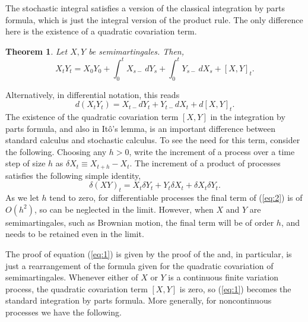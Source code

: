 \documentclass[12pt]{article}
\newtheorem*{theorem*}{Theorem}
\begin{document}

The stochastic integral satisfies a version of the classical integration by parts formula, which is just the integral version of the product rule. The only difference here is the existence of a quadratic covariation term.

\begin{theorem*}
Let $X,Y$ be semimartingales. Then,
\begin{equation}\label{eq:1}
X_tY_t = X_0Y_0+\int_0^t X_{s-}\,dY_s+\int_0^tY_{s-}\,dX_s + [X,Y]_t.
\end{equation}
\end{theorem*}

Alternatively, in differential notation, this reads
\begin{equation*}
d(X_tY_t)=X_{t-}dY_t + Y_{t-}dX_t + d[X,Y]_t.
\end{equation*}
The existence of the quadratic covariation term $[X,Y]$ in the integration by parts formula, and also in It\^o's lemma, is an important difference between standard calculus and stochastic calculus. To see the need for this term, consider the following. Choosing any $h>0$, write the increment of a process over a time step of size $h$ as $\delta X_t\equiv X_{t+h}-X_t$. The increment of a product of processes satisfies the following simple identity,
\begin{equation}\label{eq:2}
\delta (XY)_t = X_t\delta Y_t + Y_t\delta X_t + \delta X_t\delta Y_t. 
\end{equation}
As we let $h$ tend to zero, for differentiable processes the final term of (\ref{eq:2}) is of  $O(h^2)$, so can be neglected in the limit. However, when $X$ and $Y$ are semimartingales, such as Brownian motion, the final term will be of order $h$, and needs to be retained even in the limit.

The proof of equation (\ref{eq:1}) is given by the proof of the  and, in particular, is just a rearrangement of the formula given for the quadratic covariation of semimartingales. Whenever either of $X$ or $Y$ is a continuous finite variation process, the quadratic covariation term $[X,Y]$ is zero, so (\ref{eq:1}) becomes the standard integration by parts formula. More generally, for noncontinuous processes we have the following.
\end{document}
